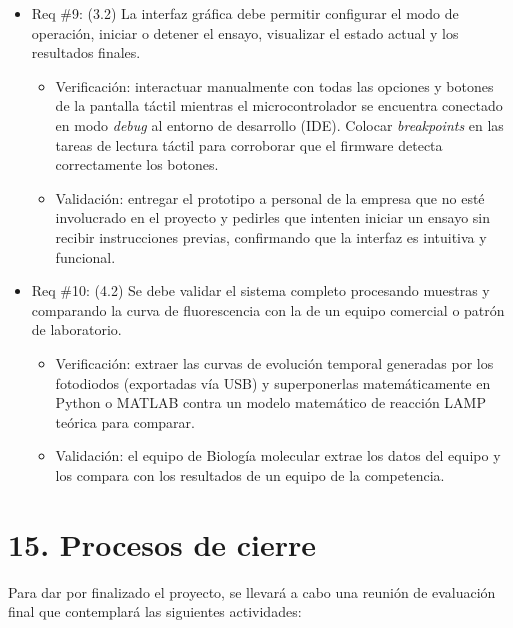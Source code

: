 \documentclass[
11pt, %
]{charter}
\begin{document}
\begin{itemize}
\item Req \#9: (3.2) La interfaz gráfica debe permitir configurar el modo de operación, iniciar o detener el ensayo, visualizar el estado actual y los resultados finales.

\begin{itemize}
	\item Verificación: interactuar manualmente con todas las opciones y botones de la pantalla táctil mientras el microcontrolador se encuentra conectado en modo \textit{debug} al entorno de desarrollo (IDE). Colocar \textit{breakpoints} en las tareas de lectura táctil para corroborar que el firmware detecta correctamente los botones.
	\item Validación: entregar el prototipo a personal de la empresa que no esté involucrado en el proyecto y pedirles que intenten iniciar un ensayo sin recibir instrucciones previas, confirmando que la interfaz es intuitiva y funcional.
\end{itemize}

\end{itemize}

\begin{itemize}
\item Req \#10: (4.2) Se debe validar el sistema completo procesando muestras y comparando la curva de fluorescencia con la de un equipo comercial o patrón de laboratorio.

\begin{itemize}
	\item Verificación: extraer las curvas de evolución temporal generadas por los fotodiodos (exportadas vía USB) y superponerlas matemáticamente en Python o MATLAB contra un modelo matemático de reacción LAMP teórica para comparar.
	\item Validación: el equipo de Biología molecular extrae los datos del equipo y los compara con los resultados de un equipo de la competencia.
\end{itemize}

\end{itemize}


\section{15. Procesos de cierre}    
\label{sec:cierre}

Para dar por finalizado el proyecto, se llevará a cabo una reunión de evaluación final que contemplará las siguientes actividades:
\end{document}
